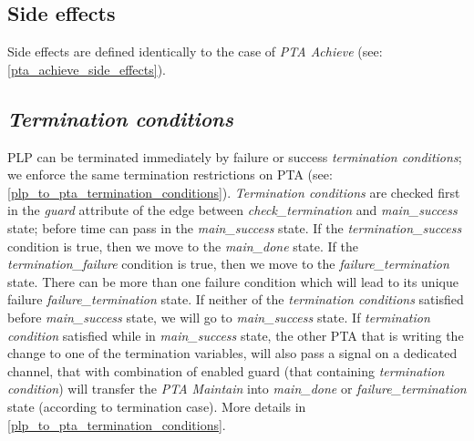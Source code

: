 \subsection{Side effects}
Side effects are defined identically to the case of \textit{PTA Achieve}  (see: \ref{pta_achieve_side_effects}).\\
\subsection{\textit{Termination conditions} }
PLP can be terminated immediately by failure or success \textit{termination conditions}; we enforce the same termination restrictions on PTA (see: \ref{plp_to_pta_termination_conditions}). \textit{Termination conditions} are checked first in the \textit{guard} attribute of the edge between \textcolor{ColorUppaalState}{\textit{check_termination}} and \textcolor{ColorUppaalState}{\textit{main_success}} state; before time can pass in the \textcolor{ColorUppaalState}{\textit{main_success}} state. If the \textcolor{ColorEdgeGuard}{\textit{termination_success}} condition is true, then we move to the \textcolor{ColorUppaalState}{\textit{main_done}} state. If the \textcolor{ColorEdgeGuard}{\textit{termination_failure}} condition is true, then we move to the \textcolor{ColorUppaalState}{\textit{failure_termination}} state. There can be more than one failure condition which will lead to its unique failure  \textcolor{ColorUppaalState}{\textit{failure_termination}} state. If neither of the \textit{termination conditions} satisfied before \textcolor{ColorUppaalState}{\textit{main_success}} state, we will go to \textcolor{ColorUppaalState}{\textit{main_success}} state. If \textit{termination condition} satisfied while in \textcolor{ColorUppaalState}{\textit{main_success}} state, the other PTA that is writing the change to one of the termination variables, will also pass a signal on a dedicated channel, that with combination of enabled guard (that containing \textit{termination condition}) will transfer the \textit{PTA Maintain} into \textcolor{ColorUppaalState}{\textit{main_done}} or \textcolor{ColorUppaalState}{\textit{failure_termination}} state (according to termination case). More details in \ref{plp_to_pta_termination_conditions}. \\
\clearpage
